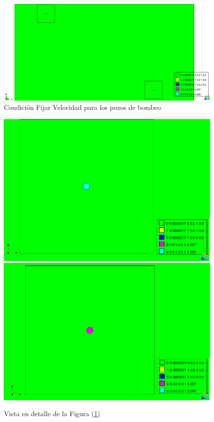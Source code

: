 \documentclass[10pt,a4paper,final]{article}
\begin{document}
\begin{figure}[tbhp]
\centerline{\includegraphics[scale=0.4]{img/100m/100_condiciones_fijar_velocidad_fondo_pozos}}
\caption{Condición Fijar Velocidad para los pozos de bombeo}
\label{100_condiciones_fijar_velocidad_fondo_pozos}
\end{figure}
\begin{figure}[htbp] 
\centering 
\includegraphics[scale=0.25]{img/100m/100_condiciones_fijar_velocidad_fondo_pozos_arriba_izquierda} 
\includegraphics[scale=0.25]{img/100m/100_condiciones_fijar_velocidad_fondo_pozos_abajo_derecha}
\caption{Vista en detalle de la Figura (\ref{100_condiciones_fijar_velocidad_fondo_pozos})} 
\label{fondo_pozos_detalles} 
\end{figure} 
\end{document}
